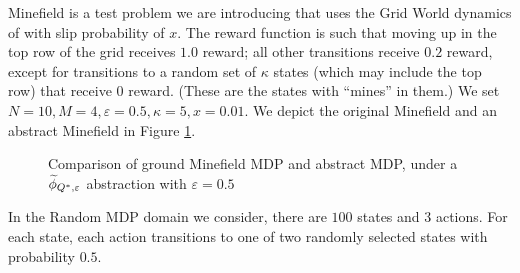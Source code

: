 Minefield is a test problem we are introducing that uses the Grid World dynamics of \citet{russell1995modern} with slip probability of $x$. The reward function is such that moving up in the top row of the grid receives $1.0$ reward; all other transitions receive $0.2$ reward, except for transitions to a random set of $\kappa$ states (which may include the top row) that receive $0$ reward. (These are the states with ``mines'' in them.) We set $N=10, M=4, \varepsilon=0.5, \kappa = 5, x = 0.01$. We depict the original Minefield and an abstract Minefield in Figure \ref{fig:minefield-vis}.
\begin{figure}
\centering
{}
\caption{Comparison of ground Minefield \ac{MDP} and abstract \ac{MDP}, under a $\widetilde \phi_{Q^*,\varepsilon}$ abstraction with $
\varepsilon=0.5$}
\label{fig:minefield-vis}
\end{figure} 
In the Random \ac{MDP} domain we consider, there are $100$ states and $3$ actions. For each state, each action transitions to one of two randomly selected states with probability $0.5$.

